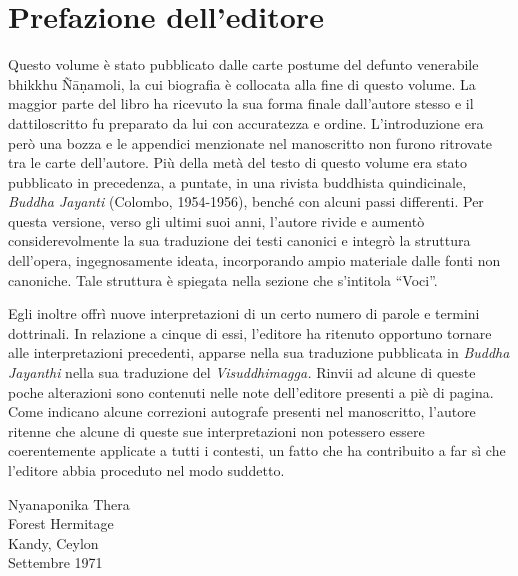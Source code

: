 \chapter{Prefazione dell’editore}

Questo volume è stato pubblicato dalle carte postume del defunto
venerabile bhikkhu Ñāṇamoli, la cui biografia è collocata alla fine di
questo volume. La maggior parte del libro ha ricevuto la sua forma
finale dall’autore stesso e il dattiloscritto fu preparato da lui con
accuratezza e ordine. L’introduzione era però una bozza e le appendici
menzionate nel manoscritto non furono ritrovate tra le carte
dell’autore. Più della metà del testo di questo volume era stato
pubblicato in precedenza, a puntate, in una rivista buddhista
quindicinale, \emph{Buddha Jayanti} (Colombo, 1954-1956), benché con alcuni
passi differenti. Per questa versione, verso gli ultimi suoi anni,
l’autore rivide e aumentò considerevolmente la sua traduzione dei testi
canonici e integrò la struttura dell’opera, ingegnosamente ideata,
incorporando ampio materiale dalle fonti non canoniche. Tale struttura è
spiegata nella sezione che s’intitola “Voci”.

Egli inoltre offrì nuove interpretazioni di un certo numero di parole e
termini dottrinali. In relazione a cinque di essi, l’editore ha ritenuto
opportuno tornare alle interpretazioni precedenti, apparse nella sua
traduzione pubblicata in \emph{Buddha Jayanthi} nella sua traduzione del
\emph{Visuddhimagga.} Rinvii ad alcune di queste poche alterazioni sono
contenuti nelle note dell’editore presenti a piè di pagina. Come
indicano alcune correzioni autografe presenti nel manoscritto, l’autore
ritenne che alcune di queste sue interpretazioni non potessero essere
coerentemente applicate a tutti i contesti, un fatto che ha contribuito
a far sì che l’editore abbia proceduto nel modo suddetto.

\bigskip

{\raggedleft
Nyanaponika Thera \\
Forest Hermitage \\
Kandy, Ceylon \\
Settembre 1971
\par}


